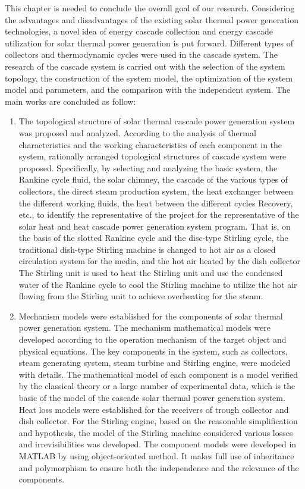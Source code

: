 %
This chapter is needed to conclude the overall goal of our research. Considering the advantages and disadvantages of the existing solar thermal power generation technologies, a novel idea of energy cascade collection and energy cascade utilization for solar thermal power generation is put forward. Different types of collectors and thermodynamic cycles were used in the cascade system. The research of the cascade system is carried out with the selection of the system topology, the construction of the system model, the optimization of the system model and parameters, and the comparison with the independent system. The main works are concluded as follow:
\begin{enumerate}[label=(\arabic*)]
  \item The topological structure of solar thermal cascade power generation system was proposed and analyzed. According to the analysis of thermal characteristics and the working characteristics of each component in the system, rationally arranged topological structures of cascade system were proposed. Specifically, by selecting and analyzing the basic system, the Rankine cycle fluid, the solar chimney, the cascade of the various types of collectors, the direct steam production system, the heat exchanger between the different working fluids, the heat between the different cycles Recovery, etc., to identify the representative of the project for the representative of the solar heat and heat cascade power generation system program. That is, on the basis of the slotted Rankine cycle and the disc-type Stirling cycle, the traditional dish-type Stirling machine is changed to hot air as a closed circulation system for the media, and the hot air heated by the dish collector The Stirling unit is used to heat the Stirling unit and use the condensed water of the Rankine cycle to cool the Stirling machine to utilize the hot air flowing from the Stirling unit to achieve overheating for the steam.
  \item Mechanism models were established for the components of solar thermal power generation system. The mechanism mathematical models were developed according to the operation mechanism of the target object and physical equations. The key components in the system, such as collectors, steam generating system, steam turbine and Stirling engine, were modeled with details. The mathematical model of each component is a model verified by the classical theory or a large number of experimental data, which is the basic of the model of the cascade solar thermal power generation system. Heat loss models were established for the receivers of trough collector and dish collector. For the Stirling engine, based on the reasonable simplification and hypothesis, the model of the Stirling machine considered various losses and irrevisibilities was developed. The component models were developed in MATLAB by using object-oriented method. It makes full use of inheritance and polymorphism to ensure both the independence and the relevance of the components.

\end{enumerate}

